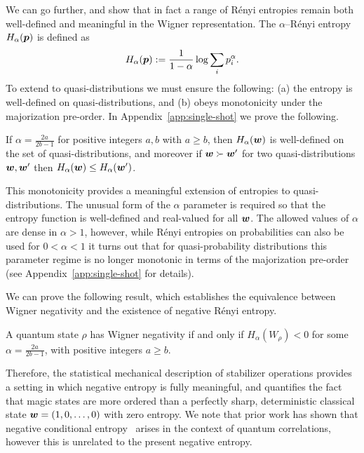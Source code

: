 \documentclass[pra,
aps,
twocolumn,
superscriptaddress,
groupedaddress,
nofootinbib,
reprint
]{revtex4-1}
\begin{document}
We can go further, and show that in fact a range of R\'{e}nyi entropies remain both well-defined and meaningful in the Wigner representation. The $\alpha$--R\'{e}nyi entropy $H_\alpha(\boldsymbol{p})$ is defined as
\begin{equation}
	H_\alpha(\boldsymbol{p}) := \frac{1}{1-\alpha} \log \sum_i p_i^\alpha.
\end{equation}
To extend to quasi-distributions we must ensure the following: (a) the entropy is well-defined on quasi-distributions, and (b) obeys monotonicity under the majorization pre-order. In Appendix~\ref{app:single-shot} we prove the following.
\begin{theorem}\label{thm:HSchur} 
	If $\alpha = \frac{2a}{2b-1}$ for positive integers $a,b$ with $a \geq b$, then $H_\alpha(\boldsymbol{w})$ is well-defined on the set of quasi-distributions, and moreover if $\boldsymbol{w} \succ \boldsymbol{w}'$ for two quasi-distributions $\boldsymbol{w}, \boldsymbol{w}'$ then $H_\alpha (\boldsymbol{w}) \leq H_\alpha(\boldsymbol{w}')$.
\end{theorem}
This monotonicity provides a meaningful extension of entropies to quasi-distributions. The unusual form of the $\alpha$ parameter is required so that the entropy function is well-defined and real-valued for all $\boldsymbol{w}$. The allowed values of $\alpha$ are dense in $\alpha >1$, however, while R\'{e}nyi entropies on probabilities can also be used for $0 < \alpha <1$ it turns out that for quasi-probability distributions this parameter regime is no longer monotonic in terms of the majorization pre-order (see Appendix~\ref{app:single-shot} for details).

We can prove the following result, which establishes the equivalence between Wigner negativity and the existence of negative R\'{e}nyi entropy.
\begin{theorem}\label{thm:Magic}
	A quantum state $\rho$ has Wigner negativity if and only if $H_\alpha(W_\rho) <0$ for some $\alpha =  \frac{2a}{2b-1}$, with positive integers $a \ge b$.
\end{theorem}
Therefore, the statistical mechanical description of stabilizer operations provides a setting in which negative entropy is fully meaningful, and quantifies the fact that magic states are more ordered than a perfectly sharp, deterministic classical state $\boldsymbol{w} = (1,0, \dots , 0)$ with zero entropy. We note that prior work has shown that negative conditional entropy~\cite{rio_thermodynamic_2011} arises in the context of quantum correlations, however this is unrelated to the present negative entropy.
\end{document}

